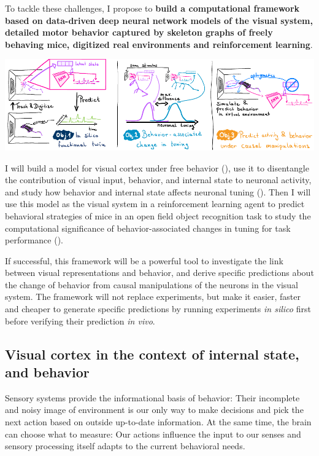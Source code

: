 \documentclass[B2,COG]{ercgrant}
\begin{document}
To tackle these challenges, I propose to \textbf{build a computational framework based on data-driven deep neural network models of the visual system, detailed motor behavior captured by skeleton graphs of freely behaving mice, digitized real environments and reinforcement learning}.

\includegraphics[width=\textwidth]{figures/overview5.pdf}

I will build a model for visual cortex under free behavior (), use it to disentangle the contribution of visual input, behavior, and internal state to neuronal activity, and study how behavior and internal state affects neuronal tuning (). Then I will use this model as the visual system in a reinforcement learning agent to predict behavioral strategies of mice in an open field object recognition task to study the computational significance of behavior-associated changes in tuning for task performance ().

If successful, this framework will be a powerful tool to investigate the link between visual representations and behavior, and derive specific predictions about the change of behavior from causal manipulations of the neurons in the visual system.
The framework will not replace experiments, but make it easier, faster and cheaper to generate specific predictions by running experiments \textit{in silico} first before verifying their prediction \textit{in vivo}. 



\subsection{Visual cortex in the context of internal state, and behavior}

Sensory systems provide the informational basis of behavior: Their incomplete and noisy image of environment is our only way to make decisions and pick the next action based on outside up-to-date information. 
At the same time, the brain can choose what to measure: Our actions influence the input to our senses and sensory processing itself adapts to the current behavioral needs. 
\end{document}
